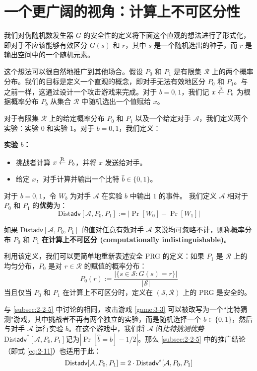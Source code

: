 \section{一个更广阔的视角：计算上不可区分性}\label{sec:3-11}

我们对伪随机数发生器 $G$ 的安全性的定义将下面这个直观的想法进行了形式化，即对手不应该能够有效区分 $G(s)$ 和 $r$，其中 $s$ 是一个随机选出的种子，而 $r$ 是输出空间中的一个随机元素。

这个想法可以很自然地推广到其他场合。假设 $P_0$ 和 $P_1$ 是有限集 $\mathcal{R}$ 上的两个概率分布。我们的目标是定义一个直观的概念，即对手无法有效地区分 $P_0$ 和 $P_1$。与之前一样，这通过设计一个攻击游戏来完成。对于 $b=0,1$，我们记 $x\overset{\rm R}\leftarrow P_b$ 为根据概率分布 $P_b$ 从集合 $\mathcal R$ 中随机选出一个值赋给 $x$。

\begin{game}[区分 $P_0$ 和 $P_1$]\label{game:3-3}
对于有限集 $\mathcal{R}$ 上的给定概率分布 $P_0$ 和 $P_1$ 以及一个给定对手 $\mathcal A$，我们定义两个实验：实验 $0$ 和实验 $1$。对于 $b=0,1$，我们定义：

\noindent\textbf{实验 $b$：}
\begin{itemize}
	\item 挑战者计算 $x\overset{\rm R}\leftarrow P_b$，并将 $x$ 发送给对手。
	\item 给定 $x$，对手计算并输出一个比特 $\hat b\in\{0,1\}$。
\end{itemize}

对于 $b=0,1$，令 $W_b$ 为对手 $\mathcal A$ 在实验 $b$ 中输出 $1$ 的事件。 我们定义 $\mathcal A$ 相对于 $P_0$ 和 $P_1$ 的\textbf{优势}为：
\[
\mathrm{Dist}\mathsf{adv}[\mathcal{A},P_0,P_1]:=\big\lvert\Pr[W_0]-\Pr[W_1]\big\rvert
\]
\end{game}

\begin{definition}[计算上不可区分性]\label{def:3-4}
如果 $\mathrm{Dist}\mathsf{adv}[\mathcal{A},P_0,P_1]$ 的值对任意有效对手 $\mathcal A$ 来说均可忽略不计，则称概率分布 $P_0$ 和 $P_1$ \textbf{在计算上不可区分 (computationally indistinguishable)}。
\end{definition}

利用该定义，我们可以更简单地重新表述安全 PRG 的定义：如果 $P_1$ 是 $\mathcal R$ 上的均匀分布，$P_0$ 是对 $r\in\mathcal R$ 的赋值的概率分布：
\[
P_0(r):=\frac{|\{s\in\mathcal{S}:G(s)=r\}|}{|\mathcal{S}|}
\]
当且仅当 $P_0$ 和 $P_1$ 在计算上不可区分时，定义在 $(\mathcal S,\mathcal R)$ 上的 PRG 是安全的。

与 \ref{subsec:2-2-5} 中讨论的相同，攻击游戏 \ref{game:3-3} 可以被改写为一个``比特猜测"游戏，其中挑战者不再有两个独立的实验，而是随机选择一个 $b\in\{0,1\}$，然后与对手 $\mathcal A$ 运行实验 $b$。在这个游戏中，我们将 $\mathcal A$ 的\emph{比特猜测优势}$\mathrm{Dist}\mathsf{adv}^*[\mathcal{A},P_0,P_1]$记为$|\Pr[\hat b=b]-{1}/{2}|$。那么 \ref{subsec:2-2-5} 中的推广结论（即式 \ref{eq:2-11}）也适用于此：
\begin{equation}
{\rm Dist\mathsf{adv}}[\mathcal{A},P_0,P_1]=2\cdot\mathrm{Dist}\mathsf{adv}^*[\mathcal{A},P_0,P_1]
\end{equation}


